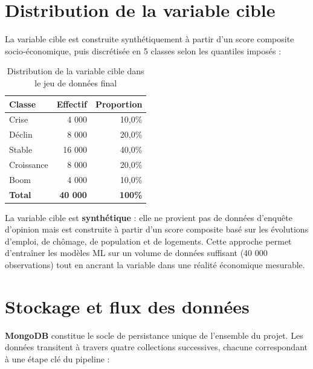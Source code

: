 \section{Distribution de la variable cible}

La variable cible est construite synthétiquement à partir d'un score composite
socio-économique, puis discrétisée en 5 classes selon les quantiles imposés :

\begin{table}[H]
\centering
\caption{Distribution de la variable cible dans le jeu de données final}
\label{tab:distribution_cible}
\begin{tabular}{lrr}
\toprule
\textbf{Classe} & \textbf{Effectif} & \textbf{Proportion} \\
\midrule
Crise      & 4 000 & 10,0\% \\
Déclin     & 8 000 & 20,0\% \\
Stable     & 16 000 & 40,0\% \\
Croissance & 8 000 & 20,0\% \\
Boom       & 4 000 & 10,0\% \\
\midrule
\textbf{Total} & \textbf{40 000} & \textbf{100\%} \\
\bottomrule
\end{tabular}
\end{table}

\begin{warnbox}
La variable cible est \textbf{synthétique} : elle ne provient pas de données d'enquête
d'opinion mais est construite à partir d'un score composite basé sur les évolutions
d'emploi, de chômage, de population et de logements. Cette approche permet d'entraîner
les modèles ML sur un volume de données suffisant (40 000 observations) tout en
ancrant la variable dans une réalité économique mesurable.
\end{warnbox}

\section{Stockage et flux des données}

\textbf{MongoDB} constitue le socle de persistance unique de l'ensemble du projet.
Les données transitent à travers quatre collections successives, chacune correspondant
à une étape clé du pipeline :

